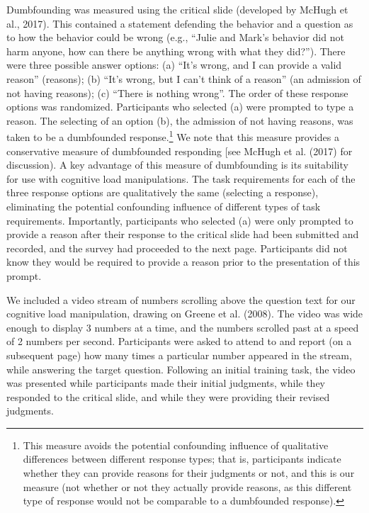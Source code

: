 \documentclass[
  man,floatsintext]{apa6}
\begin{document}
Dumbfounding was measured using the critical slide (developed by McHugh et al., 2017). This contained a statement defending the behavior and a question as to how the behavior could be wrong (e.g., ``Julie and Mark's behavior did not harm anyone, how can there be anything wrong with what they did?''). There were three possible answer options: (a) ``It's wrong, and I can provide a valid reason'' (reasons); (b) ``It's wrong, but I can't think of a reason'' (an admission of not having reasons); (c) ``There is nothing wrong''. The order of these response options was randomized. Participants who selected (a) were prompted to type a reason. The selecting of an option (b), the admission of not having reasons, was taken to be a dumbfounded response.\footnote{This measure avoids the potential confounding influence of qualitative differences between different response types; that is, participants indicate whether they can provide reasons for their judgments or not, and this is our measure (not whether or not they actually provide reasons, as this different type of response would not be comparable to a dumbfounded response).}
We note that this measure provides a conservative measure of dumbfounded responding {[}see McHugh et al. (2017) for discussion). A key advantage of this measure of dumbfounding is its suitability for use with cognitive load manipulations. The task requirements for each of the three response options are qualitatively the same (selecting a response), eliminating the potential confounding influence of different types of task requirements. Importantly, participants who selected (a) were only prompted to provide a reason after their response to the critical slide had been submitted and recorded, and the survey had proceeded to the next page. Participants did not know they would be required to provide a reason prior to the presentation of this prompt.

We included a video stream of numbers scrolling above the question text for our cognitive load manipulation, drawing on Greene et al. (2008). The video was wide enough to display 3 numbers at a time, and the numbers scrolled past at a speed of 2 numbers per second. Participants were asked to attend to and report (on a subsequent page) how many times a particular number appeared in the stream, while answering the target question. Following an initial training task, the video was presented while participants made their initial judgments, while they responded to the critical slide, and while they were providing their revised judgments.
\end{document}
